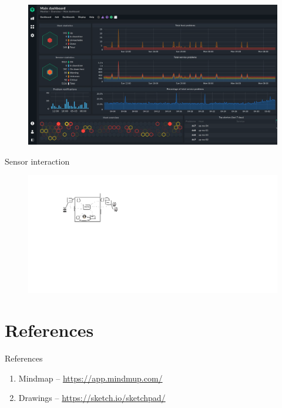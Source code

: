 \documentclass{beamer}
\begin{document}
    \begin{frame}
        \begin{figure}[H]
            \centering
            \includegraphics[width=1\textwidth]{Storyboard_UserFeedback.png}
            \label{fig:Storyboard_UserFeedback}
        \end{figure}
    \end{frame}

    \begin{frame}{Sensor interaction}
        \begin{figure}[H]
            \centering
            \includegraphics[width=2.7\textwidth]{Storyboard_Sensors.png}
            \label{fig:Storyboard_Sensors}
        \end{figure}
    \end{frame}





    \section{References}
    \begin{frame}{References}
        \begin{enumerate}
            \item Mindmap -- \url{https://app.mindmup.com/}
            \item Drawings -- \url{https://sketch.io/sketchpad/}
        \end{enumerate}
    \end{frame}
\end{document}

